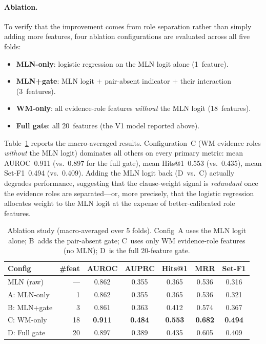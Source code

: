 \documentclass[11pt,openany]{report}
\begin{document}
\paragraph{Ablation.}
To verify that the improvement comes from role separation rather than
simply adding more features, four ablation configurations are evaluated
across all five folds:
\begin{itemize}
\item[\textbf{A.}] \textbf{MLN-only}: logistic regression on the MLN
  logit alone (1~feature).
\item[\textbf{B.}] \textbf{MLN+gate}: MLN logit $+$ pair-absent
  indicator $+$ their interaction (3~features).
\item[\textbf{C.}] \textbf{WM-only}: all evidence-role features
  \emph{without} the MLN logit (18~features).
\item[\textbf{D.}] \textbf{Full gate}: all 20~features (the V1 model
  reported above).
\end{itemize}
Table~\ref{tab:ablation} reports the macro-averaged results.
Configuration~C (WM evidence roles \emph{without} the MLN logit)
dominates all others on every primary metric: mean AUROC~0.911
(vs.\ 0.897 for the full gate), mean Hits@1~0.553 (vs.\ 0.435),
mean Set-F1~0.494 (vs.\ 0.409).  Adding the MLN logit back (D~vs.~C)
actually degrades performance, suggesting that the clause-weight signal
is \emph{redundant} once the evidence roles are separated---or, more
precisely, that the logistic regression allocates weight to the MLN
logit at the expense of better-calibrated role features.

\begin{table}[htbp]
\centering
\caption{Ablation study (macro-averaged over 5 folds).
  Config~A uses the MLN logit alone; B~adds the pair-absent gate;
  C~uses only WM evidence-role features (no MLN); D~is the full
  20-feature gate.}
\label{tab:ablation}
\small
\begin{tabular}{l r ccccc}
\toprule
Config & \#feat & AUROC & AUPRC & Hits@1 & MRR & Set-F1 \\
\midrule
MLN (raw)    & ---& 0.862 & 0.355 & 0.365 & 0.536 & 0.316 \\
A: MLN-only  &  1 & 0.862 & 0.355 & 0.365 & 0.536 & 0.321 \\
B: MLN+gate  &  3 & 0.861 & 0.363 & 0.412 & 0.574 & 0.367 \\
C: WM-only   & 18 & \textbf{0.911} & \textbf{0.484} & \textbf{0.553} & \textbf{0.682} & \textbf{0.494} \\
D: Full gate & 20 & 0.897 & 0.389 & 0.435 & 0.605 & 0.409 \\
\bottomrule
\end{tabular}
\end{table}
\end{document}
